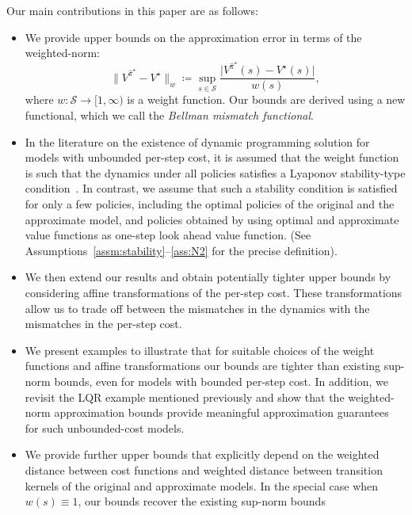 \documentclass[letterpaper, 10pt]{IEEEtran}
\newcommand*\ALPHABET{\mathcal}
\begin{document}
Our main contributions in this paper are as follows:
\begin{itemize}
    \item We provide upper bounds on the approximation error in terms of the weighted-norm:
    \[
        \| V^{\hat \pi^\star} - V^\star \|_w \coloneqq
        \sup_{s \in \ALPHABET S}
        \frac{ \bigl| V^{\hat \pi^\star}(s) - V^\star(s) \bigr|}{ w(s) },
    \]
    where $w \colon \ALPHABET S \to [1, \infty)$ is a weight function. 
    Our bounds are derived using a new functional, which we call the \emph{Bellman mismatch functional}. 
    
    
    \item In the literature on the existence of dynamic programming solution for models with unbounded per-step cost, it is assumed that the weight function is such that the dynamics under all policies satisfies a Lyaponov stability-type condition~\cite{muller1997,saldi2017asymptotic,saldi2018finite,hernandez2012discrete,hernandez2012further}.
     In contrast, we assume that such a stability condition is satisfied for only a few policies, including the optimal policies of the original and the approximate model, and policies obtained by using optimal and approximate value functions as one-step look ahead value function. (See Assumptions~\ref{assm:stability}--\ref{ass:N2} for the precise definition). 

    \item We then extend our results and obtain potentially tighter upper bounds by considering affine transformations of the per-step cost. These transformations allow us to trade off between the mismatches in the dynamics with the mismatches in the per-step cost.
    
    \item We present examples to illustrate that for suitable choices of the weight functions and affine transformations our bounds are tighter than existing sup-norm bounds, even for models with bounded per-step cost. In addition, we revisit the LQR example mentioned previously and show that the weighted-norm approximation bounds provide meaningful approximation guarantees for such unbounded-cost models.    
    
    \item We provide further upper bounds that explicitly depend on the weighted distance between cost functions and weighted distance between transition kernels of the original and approximate models.
    In the special case when $w(s) \equiv 1$, our bounds recover the existing sup-norm bounds~\cite{muller1997,abel2016near,gelada2019deepmdp} 
\end{itemize}
\end{document}
